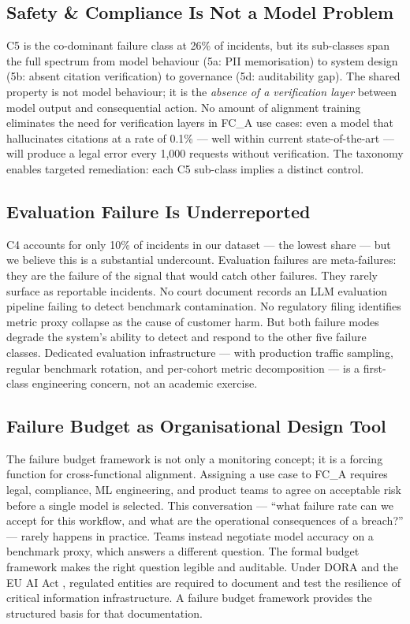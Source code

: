 \documentclass{article}
\begin{document}
\subsection{Safety \& Compliance Is Not a Model Problem}

C5 is the co-dominant failure class at 26\% of incidents, but its sub-classes
span the full spectrum from model behaviour (5a: PII memorisation) to system
design (5b: absent citation verification) to governance (5d: auditability gap).
The shared property is not model behaviour; it is the \emph{absence of a
verification layer} between model output and consequential action.  No amount
of alignment training eliminates the need for verification layers in FC\_A use
cases: even a model that hallucinates citations at a rate of 0.1\% --- well
within current state-of-the-art --- will produce a legal error every 1{,}000
requests without verification.  The taxonomy enables targeted remediation:
each C5 sub-class implies a distinct control.

\subsection{Evaluation Failure Is Underreported}

C4 accounts for only 10\% of incidents in our dataset --- the lowest share ---
but we believe this is a substantial undercount.  Evaluation failures are
meta-failures: they are the failure of the signal that would catch other
failures.  They rarely surface as reportable incidents.  No court document
records an LLM evaluation pipeline failing to detect benchmark contamination.
No regulatory filing identifies metric proxy collapse as the cause of customer
harm.  But both failure modes degrade the system's ability to detect and
respond to the other five failure classes.  Dedicated evaluation
infrastructure --- with production traffic sampling, regular benchmark rotation,
and per-cohort metric decomposition --- is a first-class engineering concern,
not an academic exercise.

\subsection{Failure Budget as Organisational Design Tool}

The failure budget framework is not only a monitoring concept; it is a forcing
function for cross-functional alignment.  Assigning a use case to FC\_A requires
legal, compliance, ML engineering, and product teams to agree on acceptable
risk before a single model is selected.  This conversation --- ``what failure
rate can we accept for this workflow, and what are the operational consequences
of a breach?'' --- rarely happens in practice.  Teams instead negotiate model
accuracy on a benchmark proxy, which answers a different question.  The formal
budget framework makes the right question legible and auditable.  Under DORA
\citep{dora2022} and the EU AI Act \citep{euaiact2024}, regulated entities are
required to document and test the resilience of critical information
infrastructure.  A failure budget framework provides the structured basis for
that documentation.
\end{document}
